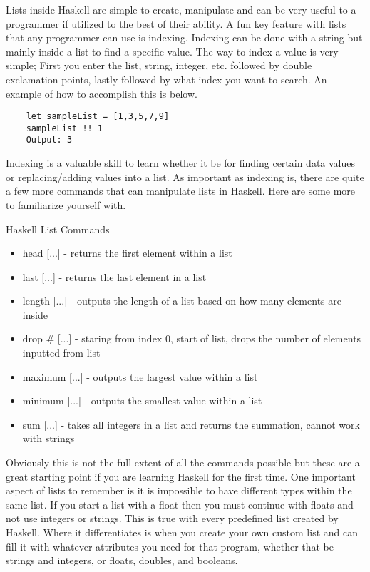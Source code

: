 \documentclass{article}
\begin{document}
    Lists inside Haskell are simple to create, manipulate and can be very useful to a programmer if utilized to the best of their ability. A fun key feature with lists that any programmer can use is indexing. Indexing can be done with a string but mainly inside a list to find a specific value. The way to index a value is very simple; First you enter the list, string, integer, etc. followed by double exclamation points, lastly followed by what index you want to search. An example of how to accomplish this is below. 
    
    \begin{lstlisting}
    let sampleList = [1,3,5,7,9]
    sampleList !! 1
    Output: 3
    \end{lstlisting}
    
    Indexing is a valuable skill to learn whether it be for finding certain data values or replacing/adding values into a list. As important as indexing is, there are quite a few more commands that can manipulate lists in Haskell. Here are some more to familiarize yourself with.
    
    \medskip\medskip
    \caption{Haskell List Commands}
    \begin{itemize}
              \item head [...] - returns the first element within a list
              \item last [...] - returns the last element in a list
              \item length [...] - outputs the length of a list based on how many elements are inside
              \item drop # [...] - staring from index 0, start of list, drops the number of elements inputted from list
              \item maximum [...] - outputs the largest value within a list
              \item minimum [...] - outputs the smallest value within a list
              \item sum [...] - takes all integers in a list and returns the summation, cannot work with strings
    \end{itemize}
    
    \medskip
    \noindent Obviously this is not the full extent of all the commands possible but these are a great starting point if you are learning Haskell for the first time. One important aspect of lists to remember is it is impossible to have different types within the same list. If you start a list with a float then you must continue with floats and not use integers or strings. This is true with every predefined list created by Haskell. Where it differentiates is when you create your own custom list and can fill it with whatever attributes you need for that program, whether that be strings and integers, or floats, doubles, and booleans. 
\end{document}
